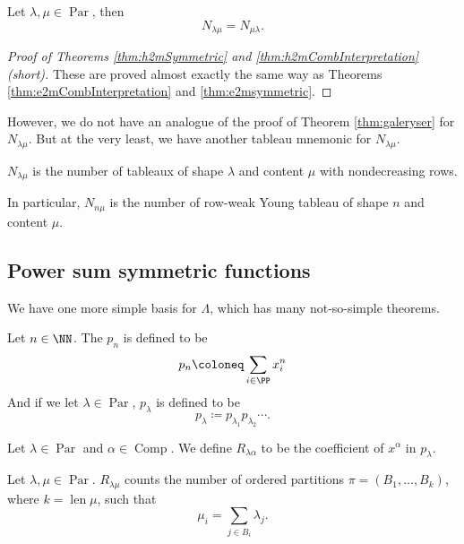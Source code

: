 \documentclass{article}
\DeclareMathOperator{\len}{len}
\DeclareMathOperator{\Par}{Par}
\DeclareMathOperator{\Com}{Comp}
\begin{document}
\begin{theorem} \label{thm:h2mSymmetric}
    Let $\lambda, \mu \in \Par$, then
    \[
        N_{\lambda\mu} = N_{\mu\lambda}.
    \]
\end{theorem}

\begin{proof}[Proof of Theorems \ref{thm:h2mSymmetric} and \ref{thm:h2mCombInterpretation} (short)]
    These are proved almost exactly the same way as Theorems \ref{thm:e2mCombInterpretation} and \ref{thm:e2msymmetric}.
\end{proof}

However, we do not have an analogue of the proof of Theorem \ref{thm:galeryser} for $N_{\lambda\mu}$.
But at the very least, we have another tableau mnemonic for $N_{\lambda\mu}$.

\begin{theorem}
    $N_{\lambda\mu}$ is the number of tableaux of shape $\lambda$ and content $\mu$ with nondecreasing rows. 

    In particular, $N_{n\mu}$ is the number of row-weak Young tableau of shape $n$ and content $\mu$.
\end{theorem}

\subsection{Power sum symmetric functions}

We have one more simple basis for $\Lambda$, which has many not-so-simple theorems.

\begin{definition}
    Let $n\in\NN$. The  $p_n$ is defined to be
    \[
        p_n 
        \coloneq 
        \sum_{i\in\PP} x_i^n
    \]
    And if we let $\lambda \in \Par$, $p_\lambda$ is defined to be
    \[
        p_\lambda 
        \coloneq 
        p_{\lambda_1}p_{\lambda_2}\cdots.
    \]
\end{definition}

\begin{definition}
    Let $\lambda \in \Par$ and $\alpha \in \Com$.
    We define $R_{\lambda\alpha}$ to be the coefficient of $x^\alpha$ in $p_\lambda$.
\end{definition}

\begin{theorem}
    Let $\lambda, \mu \in \Par$.
    $R_{\lambda\mu}$ counts the number of ordered partitions $\pi = (B_1, \ldots, B_k)$, where $k = \len \mu$, such that
    \[
        \mu_i = \sum_{j\in B_i} \lambda_j.
    \]
\end{theorem}
\end{document}
